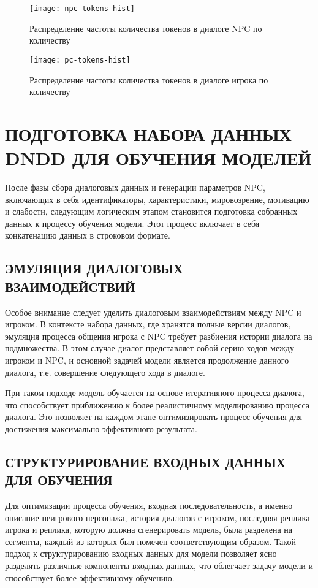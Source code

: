 \begin{figure}[H]
      \centering
      \texttt{[image: npc-tokens-hist]}
      \caption{Распределение частоты количества токенов в диалоге NPC по количеству}
      \label{fig:npc-tokens-hist}
\end{figure}

\begin{figure}[H]
      \centering
      \texttt{[image: pc-tokens-hist]}
      \caption{Распределение частоты количества токенов в диалоге игрока по количеству}
      \label{fig:pc-tokens-hist}
\end{figure}

\section{ПОДГОТОВКА НАБОРА ДАННЫХ DNDD ДЛЯ ОБУЧЕНИЯ МОДЕЛЕЙ}

После фазы сбора диалоговых данных и генерации параметров NPC, включающих в себя идентификаторы, характеристики, мировозрение, мотивацию и слабости, следующим логическим этапом становится подготовка собранных данных к процессу обучения модели. Этот процесс включает в себя конкатенацию данных в строковом формате.

\subsection{ЭМУЛЯЦИЯ ДИАЛОГОВЫХ ВЗАИМОДЕЙСТВИЙ}

Особое внимание следует уделить диалоговым взаимодействиям между NPC и игроком. В контексте набора данных, где хранятся полные версии диалогов, эмуляция процесса общения игрока с NPC требует разбиения истории диалога на подмножества. В этом случае диалог представляет собой серию ходов между игроком и NPC, и основной задачей модели является продолжение данного диалога, т.е. совершение следующего хода в диалоге.

При таком подходе модель обучается на основе итеративного процесса диалога, что способствует приближению к более реалистичному моделированию процесса диалога. Это позволяет на каждом этапе оптимизировать процесс обучения для достижения максимально эффективного результата.

\subsection{СТРУКТУРИРОВАНИЕ ВХОДНЫХ ДАННЫХ ДЛЯ ОБУЧЕНИЯ}

Для оптимизации процесса обучения, входная последовательность, а именно описание неигрового персонажа, история диалогов с игроком, последняя реплика игрока и реплика, которую должна сгенерировать модель, была разделена на сегменты, каждый из которых был помечен соответствующим образом. Такой подход к структурированию входных данных для модели позволяет ясно разделять различные компоненты входных данных, что облегчает задачу модели и способствует более эффективному обучению.

